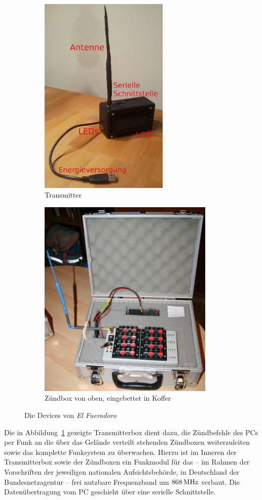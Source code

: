 \documentclass[pdftex, parskip, numbers=noenddot, toc=listof]{scrbook}
\newcommand{\anlage}{\emph{El Fueradoro}}
\begin{document}
	\begin{figure}
		\centering
		\begin{subfigure}[t]{0.405\textwidth}
			\includegraphics[height=96mm]{Bilder/Transmitter}
			\caption{Transmitter}
			\label{fig:transmitter}
		\end{subfigure}
		\begin{subfigure}[t]{0.55\textwidth}
			\includegraphics[height=96mm]{Bilder/DraufsichtZuendbox}
			\caption{Zündbox von oben, eingebettet in Koffer}
			\label{fig:zuendbox}
		\end{subfigure}%
		\caption{Die Devices von {\anlage}}
	\end{figure}

	Die in Abbildung~\ref{fig:transmitter} gezeigte Transmitterbox dient dazu, die Zündbefehle des PCs per Funk an die über das Gelände verteilt stehenden Zündboxen weiterzuleiten sowie das komplette Funksystem zu überwachen. Hierzu ist im Inneren der Transmitterbox sowie der Zündboxen ein Funkmodul für das -- im Rahmen der Vorschriften der jeweiligen nationalen Aufsichtsbehörde, in Deutschland der Bundesnetzagentur -- frei nutzbare Frequenzband um $\unit[868]{MHz}$ verbaut. Die Datenübertragung vom PC geschieht über eine serielle Schnittstelle.
\end{document}
